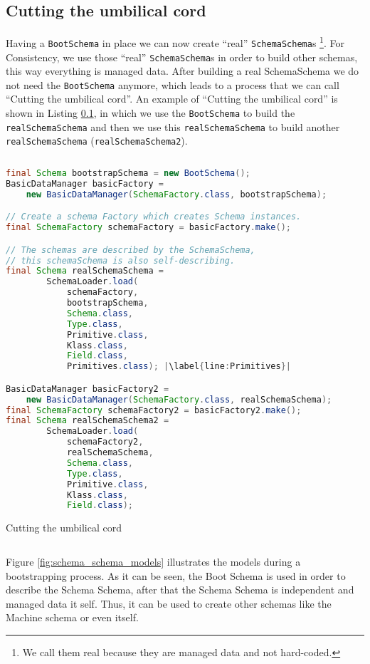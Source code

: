 \subsection{Cutting the umbilical cord}\label{subsec:Cutting the umbilical cord}
Having a \texttt{BootSchema} in place we can now create ``real'' \texttt{SchemaSchema}s \footnote{
	We call them real because they are managed data and not hard-coded.}.
For Consistency, we use those ``real'' \texttt{SchemaSchema}s in order to build other schemas, this way everything is managed data.
After building a real SchemaSchema we do not need the \texttt{BootSchema} anymore, which leads to a process that we can call ``Cutting the umbilical cord''.
An example of ``Cutting the umbilical cord'' is shown in Listing \ref{subsec:Cutting the umbilical cord}, in which we use the \texttt{BootSchema} to build the \texttt{realSchemaSchema} and then we use this \texttt{realSchemaSchema} to build another \texttt{realSchemaSchema} (\texttt{realSchemaSchema2}).

\begin{sourcecode} [H]
	\begin{lstlisting}[language=Java, escapechar=|]
final Schema bootstrapSchema = new BootSchema();
BasicDataManager basicFactory = 
	new BasicDataManager(SchemaFactory.class, bootstrapSchema);

// Create a schema Factory which creates Schema instances.
final SchemaFactory schemaFactory = basicFactory.make();

// The schemas are described by the SchemaSchema, 
// this schemaSchema is also self-describing.
final Schema realSchemaSchema =
        SchemaLoader.load(
        	schemaFactory, 
        	bootstrapSchema, 
        	Schema.class, 
        	Type.class, 
        	Primitive.class, 
        	Klass.class, 
        	Field.class,
        	Primitives.class); |\label{line:Primitives}|

BasicDataManager basicFactory2 = 
	new BasicDataManager(SchemaFactory.class, realSchemaSchema);
final SchemaFactory schemaFactory2 = basicFactory2.make();
final Schema realSchemaSchema2 =
        SchemaLoader.load(
        	schemaFactory2, 
        	realSchemaSchema, 
        	Schema.class, 
        	Type.class, 
        	Primitive.class, 
        	Klass.class, 
        	Field.class);
	\end{lstlisting}
	\caption{Cutting the umbilical cord}
	\label{lst:Cutting the umbilical cord}
\end{sourcecode}

Figure \ref{fig:schema_schema_models} illustrates the models during a bootstrapping process.
As it can be seen, the Boot Schema is used in order to describe the Schema Schema, after that the Schema Schema is independent and managed data it self.
Thus, it can be used to create other schemas like the Machine schema or even itself.

